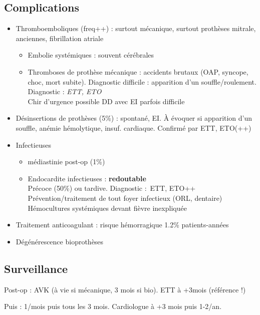 \subsection{Complications}
\begin{itemize}
  \item Thromboemboliques (freq++) : surtout mécanique, surtout prothèses mitrale,
    anciennes, fibrillation atriale
    \begin{itemize}
      \item Embolie systémiques : souvent cérébrales
      \item Thromboses de prothèse mécanique : accidents brutaux (OAP, syncope,
        choc, mort subite). Diagnostic difficile : apparition d'un
        souffle/roulement. Diagnostic : \textit{ETT, ETO} \\
        Chir d'urgence possible
        \danger DD avec EI parfois difficile
    \end{itemize}
  \item Désinsertions de prothèses (5\%) : spontané, EI. À évoquer si apparition d'un
    souffle, anémie hémolytique, insuf. cardiaque. Confirmé par ETT, ETO(++)

  \item Infectieuses
    \begin{itemize}
      \item médiastinie post-op (1\%)
      \item Endocardite infectieuses : \textbf{redoutable} \skull\\
        Précoce (50\%) ou tardive. Diagnostic : ETT, ETO++\\
        Prévention/traitement de tout foyer infectieux (ORL, dentaire)\\
        Hémocultures systémiques devant fièvre inexpliquée
    \end{itemize}
  \item Traitement anticoagulant : risque hémorragique 1.2\% patients-années
  \item Dégénérescence bioprothèses
\end{itemize}

\subsection{Surveillance}
Post-op : AVK (à vie si mécanique, 3 mois si bio). ETT à +3mois (référence !)

Puis : 1/mois puis tous les 3 mois. Cardiologue à +3 mois puis 1-2/an.

